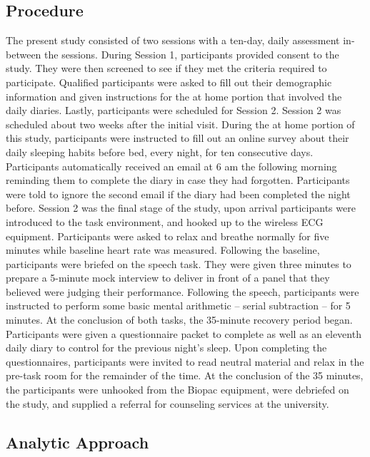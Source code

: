 \documentclass[man, fleqn, noextraspace]{apa6}
\begin{document}
\hypertarget{procedure}{%
\subsection{Procedure}\label{procedure}}

The present study consisted of two sessions with a ten-day, daily assessment in-between the sessions. During Session 1, participants provided consent to the study. They were then screened to see if they met the criteria required to participate. Qualified participants were asked to fill out their demographic information and given instructions for the at home portion that involved the daily diaries. Lastly, participants were scheduled for Session 2. Session 2 was scheduled about two weeks after the initial visit. During the at home portion of this study, participants were instructed to fill out an online survey about their daily sleeping habits before bed, every night, for ten consecutive days. Participants automatically received an email at 6 am the following morning reminding them to complete the diary in case they had forgotten. Participants were told to ignore the second email if the diary had been completed the night before. Session 2 was the final stage of the study, upon arrival participants were introduced to the task environment, and hooked up to the wireless ECG equipment. Participants were asked to relax and breathe normally for five minutes while baseline heart rate was measured. Following the baseline, participants were briefed on the speech task. They were given three minutes to prepare a 5-minute mock interview to deliver in front of a panel that they believed were judging their performance. Following the speech, participants were instructed to perform some basic mental arithmetic -- serial subtraction -- for 5 minutes. At the conclusion of both tasks, the 35-minute recovery period began. Participants were given a questionnaire packet to complete as well as an eleventh daily diary to control for the previous night's sleep. Upon completing the questionnaires, participants were invited to read neutral material and relax in the pre-task room for the remainder of the time. At the conclusion of the 35 minutes, the participants were unhooked from the Biopac equipment, were debriefed on the study, and supplied a referral for counseling services at the university.

\hypertarget{analytic-approach}{%
\subsection{Analytic Approach}\label{analytic-approach}}
\end{document}
